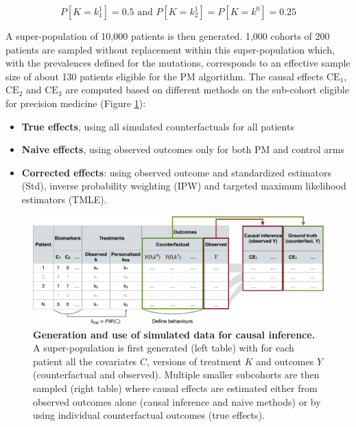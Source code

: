 \documentclass[a4paper,12pt,twoside,onecolumn,openright,final,oldfontcommands]{memoir}
\providecommand{\tightlist}{%
  \setlength{\itemsep}{0pt}\setlength{\parskip}{0pt}}
\begin{document}
\[P[K=k^1_1]=0.5 \text{ and } P[K=k^1_2]=P[K=k^0]=0.25\]

A super-population of 10,000 patients is then generated. 1,000 cohorts
of 200 patients are sampled without replacement within this
super-population which, with the prevalences defined for the mutations,
corresponds to an effective sample size of about 130 patients eligible
for the PM algortithm. The causal effects \(\text{CE}_1\),
\(\text{CE}_2\) and \(\text{CE}_3\) are computed based on different
methods on the sub-cohort eligible for precision medicine (Figure
\ref{fig:causal-struct}):

\begin{itemize}
\tightlist
\item
  \textbf{True effects}, using all simulated counterfactuals for all
  patients
\item
  \textbf{Naive effects}, using observed outcomes only for both PM and
  control arms
\item
  \textbf{Corrected effects}: using observed outcome and standardized
  estimators (Std), inverse probability weighting (IPW) and targeted
  maximum likelihood estimators (TMLE).
\end{itemize}

\begin{figure}

{\centering \includegraphics[width=0.9\linewidth]{fig/causal-struct} 

}

\caption[Generation and use of simulated data for causal inference]{\textbf{Generation and use of simulated data
for causal inference.} A super-population is first generated (left
table) with for each patient all the covariates \(C\), versions of
treatment \(K\) and outcomes \(Y\) (counterfactual and observed).
Multiple smaller subcohorts are then sampled (right table) where causal
effects are estimated either from observed outcomes alone (causal
inference and naive methods) or by using individual counterfactual
outcomes (true effects).}\label{fig:causal-struct}
\end{figure}
\end{document}
